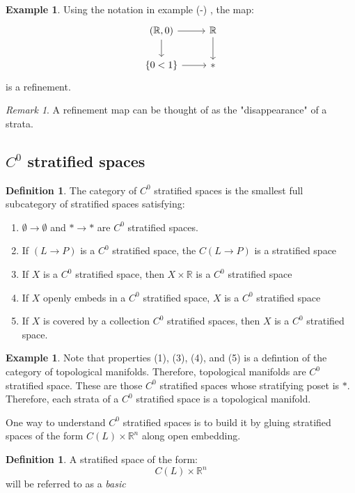 \documentclass[11pt,reqno]{amsart}
\theoremstyle{plain}
\numberwithin{equation}{section}
\theoremstyle{remark}
\newtheorem{rek}[thm]{Remark}
\theoremstyle{definition}
\newtheorem{defi}[thm]{Definition}
\newtheorem{ex}[thm]{Example}
\newcommand{\R}{\mathbb{R}}
\begin{document}
\begin{ex}
Using the notation in example (-) , the map:
$$
\begin{tikzcd}
{(\R, 0)} \arrow[d] \arrow[r] & \R \arrow[d] \\
\{0<1\} \arrow[r]             & *           
\end{tikzcd}
$$
is a refinement.
\end{ex}

\begin{rek}
A refinement map can be thought of as the "disappearance" of a strata.
\end{rek}


\subsection{$C^0$ stratified spaces}

\begin{defi} 
The category of $C^0$ stratified spaces is the smallest full subcategory of stratified spaces satisfying:
\begin{enumerate}
	\item $\emptyset \rightarrow \emptyset$ and $*\rightarrow *$ are $C^0$ stratified spaces.
	\item If $(L\rightarrow P)$ is a $C^0$ stratified space, the $C(L\rightarrow P)$ is a stratified space
	\item If $X$ is a $C^0$ stratified space, then $X\times \R$ is a $C^0$ stratified space
	\item If $X$ openly embeds in a $C^0$ stratified space, $X$ is a $C^0$ stratified space
	\item If $X$ is covered by a collection $C^0$ stratified spaces, then $X$ is a $C^0$ stratified space.
\end{enumerate}
\end{defi}

\begin{ex}
Note that properties (1), (3), (4), and (5) is a defintion of the category of topological manifolds. Therefore, topological manifolds are $C^0$ stratified space. These are those $C^0$ stratified spaces whose stratifying poset is $*$. Therefore, each strata of a $C^0$ stratified space is a topological manifold. 
\end{ex}

One way to understand $C^0$ stratified spaces is to build it by gluing stratified spaces of the form $C(L)\times \R^n$ along open embedding. 

\begin{defi}
A stratified space of the form:
$$
C(L) \times \R^n
$$
will be referred to as a \textit{basic}
\end{defi}
\end{document}
